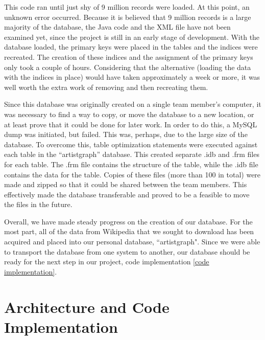 \documentclass{sig-alternate}
\begin{document}
This code ran until just shy of 9 million records were loaded. At this point, an unknown error occurred.
Because it is believed that 9 million records is a large majority of the
database, the Java code and the XML file have not been examined yet, since the project is still in an early stage of development. 
With the database loaded, the primary keys were placed in the tables and the indices were recreated.  
The creation of these indices and the assignment of the primary keys only took a couple of hours. 
Considering that the alternative (loading the data with the indices in place) would have taken approximately a week or more,
it was well worth the extra work of removing and then recreating them.
 
Since this database was originally created on a single team member's computer, it was necessary to find a way to copy, 
or move the database to a new location, or at least prove that it could be done for later work.
In order to do this, a MySQL dump was initiated, but failed. This was, perhaps, due to the large size of the database. 
To overcome this, table optimization statements were executed against each table in the ``artistgraph'' database. 
This created separate .idb and .frm files for each table. The .frm file contains the structure of the table, while the 
.idb file contains the data for the table. Copies of these files (more than 100 in total) were made and zipped so that it could 
be shared between the team members. This effectively made the database transferable and proved to be a feasible to move the files in the future.
 
Overall, we have made steady progress on the creation of our database. For the most part, 
all of the data from Wikipedia that we sought to download has been acquired and placed into
our personal database, ``artistgraph". Since we were able to transport the database from one system to another, 
our database should be ready for the next step in our project, code implementation
\ref{code implementation}. 

\section{Architecture and Code Implementation}
\label{architecture and code implementation}
\end{document}
